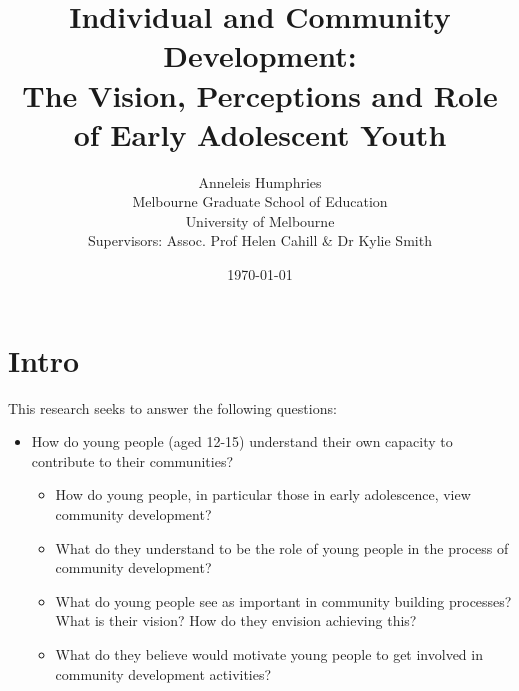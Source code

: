 \documentclass[12pt,a4paper]{report}
\title{{%
		Individual and Community Development: \\
		\Large The Vision, Perceptions and Role of Early Adolescent Youth}}
\author{Anneleis Humphries \\
	Melbourne Graduate School of Education \\
	University of Melbourne \\
	Supervisors: Assoc. Prof Helen Cahill \& Dr Kylie Smith}
\date{\today}
\begin{document}
	
%	

	
	\maketitle 
	\hypersetup{linkcolor=blue} 
	\tableofcontents
	\newpage
	\chapter{Intro}
This research seeks to answer the following questions:
		\begin{itemize} 
			\item How do young people (aged 12-15) understand their own capacity to contribute to their communities?
			\begin{itemize}
				\item How do young people, in particular those in early adolescence, view community development? 
				\item What do they understand to be the role of young people in the process of community development?
				\item What do young people see as important in community building processes? What is their vision? How do they envision achieving this?
				\item What do they believe would motivate young people to get involved in community development activities?
			\end{itemize}
		\end{itemize}
	
	
	
	
	\printindex
	
%	
\end{document}
